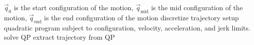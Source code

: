 \begin{algorithm}
\caption{Trajectory Generation}
\begin{algorithmic}[1]
\label{alg:trajgen}
\REQUIRE $\vec{q}_0$ is the start configuration of the motion, $\vec{q}_\mathrm{mid}$ is the mid configuration of the motion, $\vec{q}_\mathrm{end}$ is the end configuration of the motion
\STATE discretize trajectory
\STATE setup quadratic program subject to configuration, velocity, acceleration, and jerk limits.
\STATE solve QP
\RETURN extract trajectory from QP
\ENDIF
\ENDFOR
\end{algorithmic}
\end{algorithm}